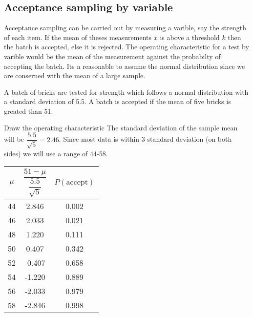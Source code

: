     \subsection{Acceptance sampling by variable}
    Acceptance sampling can be carried out by measuring a varible, say the strength of each item. If the mean of theses measurements $\bar{x}$ is above a threshold $k$ then the batch is accepted, else it is rejected. The operating characteristic for a test by varible would be the mean of the measurement against the probabilty of accepting the batch. Its a reasonable to assume the normal distribution since we are conserned with the mean of a large sample.

    \begin{example}
    {
        A batch of bricks are tested for strength which follows a normal distribution with a standard deviation of 5.5. A batch is accepted if the mean of five bricks is greated than 51.
    }

    \begin{step}{Draw the operating characteristic}
    The standard deviation of the sample mean will be $\dfrac{5.5}{\sqrt{5}} = 2.46$. Since most data is within 3 standard deviation (on both sides) we will use a range of 44-58.
    
    \begin{center}
    \begin{tabular}{c|c|c}
    $\mu$ & $\dfrac{51-\mu}{\dfrac{5.5}{\sqrt{5}}}$ & $P(\text{accept})$ \\
    \hline
    44 & 2.846 & 0.002 \\ 
    46 & 2.033 & 0.021 \\
    48 & 1.220 & 0.111 \\
    50 & 0.407 & 0.342 \\
    52 & -0.407 & 0.658 \\
    54 & -1.220 & 0.889 \\
    56 & -2.033 & 0.979 \\
    58 & -2.846 & 0.998 \\
    \end{tabular}
    \end{center}
    
    \begin{center}
    \end{center}


\end{step}
\end{example}
